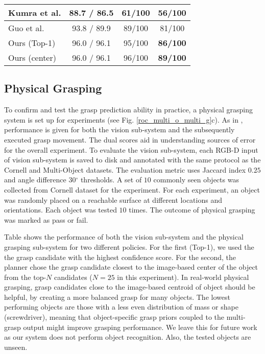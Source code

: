 \documentclass[letterpaper, 10 pt, journal, twoside]{IEEEtran}
\begin{document}
\begin {table}[t]
\begin{tabular}{ | l | c | c | c |}
    Kumra et al.	\cite{kumra2016robotic}       & 88.7   /  86.5   & 61/100   &  56/100  \\ \hline
    Guo et al. \cite{GuEtAl_ICRA2017}         & 93.8   /  89.9   & 89/100   & 81/100  \\ \hline \hline
    Ours (Top-1)                             &  96.0   /  96.1   &  95/100   &  \bf{86}/100  \\ \hline 
    Ours (center)                 &  96.0   /  96.1  &  96/100   &  \bf{89}/100  \\ 

    \hline
  \end{tabular}
\vspace*{-1ex}
\end {table}


\subsection{Physical Grasping}
To confirm and test the grasp prediction ability in practice, a physical
grasping system is set up for experiments (see Fig. \ref{roc_multi_o_multi_g}c). 
As in \cite{watson2017real}, performance is given for both the vision
sub-system and the subsequently executed grasp movement.   The dual
scores aid in understanding sources of error for the overall experiment.
To evaluate the vision sub-system, each RGB-D input of vision sub-system
is saved to disk and annotated with the same protocol as the Cornell and
Multi-Object datasets.  The evaluation metric uses Jaccard index
$0.25$ and angle difference 30$^\circ$ thresholds. 
A set of $10$ commonly seen objects was collected from Cornell dataset for the experiment.
For each experiment, an object was randomly placed on a reachable
surface at different locations and orientations. Each object was tested
$10$ times.  The outcome of physical grasping was marked as pass or fail.

Table  shows the performance of both the vision sub-system and
the physical grasping sub-system for two different policies.  For the
first (Top-1), we used the the grasp candidate with the highest
confidence score. For the second, the planner chose the grasp candidate
closest to the image-based center of the object from the top-$N$ candidates
($N=25$ in this experiment). 
In real-world physical grasping, grasp candidates close to the image-based
centroid of object should be helpful, by creating a more balanced grasp for
many objects.
The lowest performing objects
are those with a less even distribution of mass or shape (screwdriver), 
meaning that object-specific grasp priors coupled to the multi-grasp
output might improve grasping performance.  We leave this for future
work as our system does not perform object recognition. Also, the tested
objects are unseen.
\end{document}
